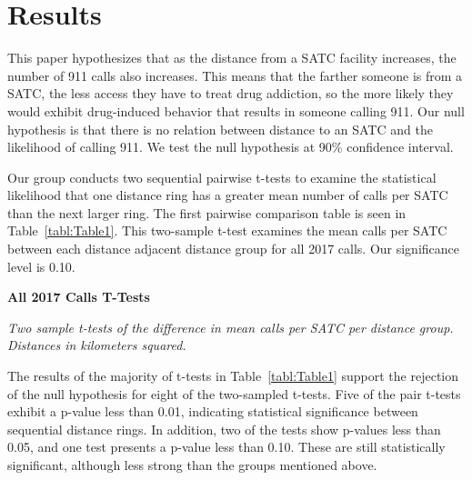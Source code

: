 \documentclass[12pt]{article}
\begin{document}


\section{Results}
\label{sec:result}

This paper hypothesizes that as the distance from a SATC facility increases, the number of 911 calls also increases. This means that the farther someone is from a SATC, the less access they have to treat drug addiction, so the more likely they would exhibit drug-induced behavior that results in someone calling 911. Our null hypothesis is that there is no relation between distance to an SATC and the likelihood of calling 911. We test the null hypothesis at 90\% confidence interval. 

Our group conducts two sequential pairwise t-tests to examine the statistical likelihood that one distance ring has a greater mean number of calls per SATC than the next larger ring. The first pairwise comparison table is seen in Table~\ref{tabl:Table1}. This two-sample t-test examines the mean calls per SATC between each distance adjacent distance group for all 2017 calls. Our significance level is 0.10.

\begin{table}[htbp]
\begin{center}

\end{center}

\caption{\textbf{All 2017 Calls T-Tests}}
\label{tabl:Table1}
\centering\textit{Two sample t-tests of the difference in mean calls per SATC per distance group.}
\textit{Distances in kilometers squared.}
\end{table}


The results of the majority of t-tests in Table~\ref{tabl:Table1} support the rejection of the null hypothesis for eight of the two-sampled t-tests. Five of the pair t-tests exhibit a p-value less than 0.01, indicating statistical significance between sequential distance rings. In addition, two of the tests show p-values less than 0.05, and one test presents a p-value less than 0.10. These are still statistically significant, although less strong than the groups mentioned above. 
\end{document}
